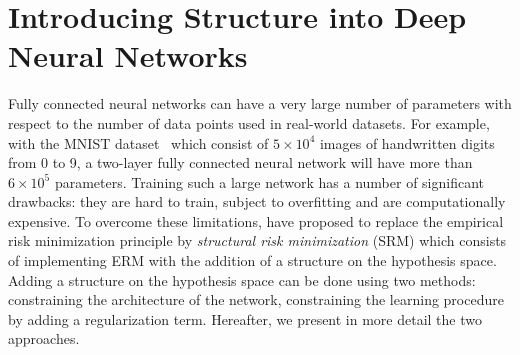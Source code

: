 


\section{Introducing Structure into Deep Neural Networks}
\label{section:ch1-introducting_structure_into_deep_neural_networks}


Fully connected neural networks can have a very large number of parameters with respect to the number of data points used in real-world datasets.
For example, with the MNIST dataset~\cite{lecun1998gradient} which consist of $5 \times 10^4$ images of handwritten digits from 0 to 9, a two-layer fully connected neural network will have more than $6 \times 10^5$ parameters.
Training such a large network has a number of significant drawbacks: they are hard to train, subject to overfitting and are computationally expensive.
To overcome these limitations, \citet{vapnik1992principles} have proposed to replace the empirical risk minimization principle by \emph{structural risk minimization} (SRM) which consists of implementing ERM with the addition of a structure on the hypothesis space.
Adding a structure on the hypothesis space can be done using two methods: constraining the architecture of the network, constraining the learning procedure by adding a regularization term. 
Hereafter, we present in more detail the two approaches.  





